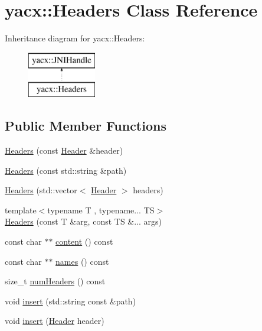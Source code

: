 \hypertarget{classyacx_1_1_headers}{}\section{yacx\+:\+:Headers Class Reference}
\label{classyacx_1_1_headers}
Inheritance diagram for yacx\+:\+:Headers\+:\begin{figure}[H]
\begin{center}
\leavevmode
\includegraphics[height=2.000000cm]{classyacx_1_1_headers}
\end{center}
\end{figure}
\subsection*{Public Member Functions}
\begin{DoxyCompactItemize}
\item 
\hyperlink{classyacx_1_1_headers_ae04c7a09aac2e2417c7f5cb3410b011f}{Headers} (const \hyperlink{classyacx_1_1_header}{Header} \&header)
\item 
\hyperlink{classyacx_1_1_headers_af379ab4de8a97b9af8eff850987ce1d5}{Headers} (const std\+::string \&path)
\item 
\hyperlink{classyacx_1_1_headers_a4741fcbd110385f037be9091e20fd4a9}{Headers} (std\+::vector$<$ \hyperlink{classyacx_1_1_header}{Header} $>$ headers)
\item 
{\footnotesize template$<$typename T , typename... TS$>$ }\\\hyperlink{classyacx_1_1_headers_a2c695f86d62e478719878b37027e6cde}{Headers} (const T \&arg, const TS \&... args)
\item 
const char $\ast$$\ast$ \hyperlink{classyacx_1_1_headers_a80a31e958e7b1248bafdef6ce0c30c3c}{content} () const
\item 
const char $\ast$$\ast$ \hyperlink{classyacx_1_1_headers_aacf2017f07c4e9374a95facdf88863d7}{names} () const
\item 
size\+\_\+t \hyperlink{classyacx_1_1_headers_aed5718d17f7ab4e82b830708220fd00e}{num\+Headers} () const
\item 
void \hyperlink{classyacx_1_1_headers_a0428360b3ce224adc3a22bdbd486bfa0}{insert} (std\+::string const \&path)
\item 
void \hyperlink{classyacx_1_1_headers_a43251bcac778655f4b539e4e8f56e672}{insert} (\hyperlink{classyacx_1_1_header}{Header} header)
\end{DoxyCompactItemize}


